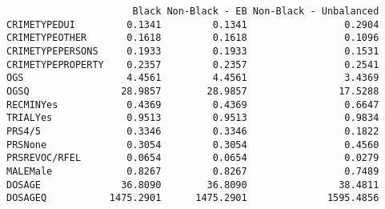 \documentclass[
  letterpaper,
  DIV=11,
  numbers=noendperiod]{scrartcl}
\newenvironment{Shaded}{\begin{snugshade}}{\end{snugshade}}
\newcommand{\AttributeTok}[1]{\textcolor[rgb]{0.40,0.45,0.13}{#1}}
\newcommand{\DecValTok}[1]{\textcolor[rgb]{0.68,0.00,0.00}{#1}}
\newcommand{\FunctionTok}[1]{\textcolor[rgb]{0.28,0.35,0.67}{#1}}
\newcommand{\NormalTok}[1]{\textcolor[rgb]{0.00,0.23,0.31}{#1}}
\newcommand{\OtherTok}[1]{\textcolor[rgb]{0.00,0.23,0.31}{#1}}
\newcommand{\SpecialCharTok}[1]{\textcolor[rgb]{0.37,0.37,0.37}{#1}}
\newcommand{\StringTok}[1]{\textcolor[rgb]{0.13,0.47,0.30}{#1}}
\begin{document}
\begin{Shaded}
\end{Shaded}

\begin{verbatim}
                      Black Non-Black - EB Non-Black - Unbalanced
CRIMETYPEDUI         0.1341         0.1341                 0.2904
CRIMETYPEOTHER       0.1618         0.1618                 0.1096
CRIMETYPEPERSONS     0.1933         0.1933                 0.1531
CRIMETYPEPROPERTY    0.2357         0.2357                 0.2541
OGS                  4.4561         4.4561                 3.4369
OGSQ                28.9857        28.9857                17.5288
RECMINYes            0.4369         0.4369                 0.6647
TRIALYes             0.9513         0.9513                 0.9834
PRS4/5               0.3346         0.3346                 0.1822
PRSNone              0.3054         0.3054                 0.4560
PRSREVOC/RFEL        0.0654         0.0654                 0.0279
MALEMale             0.8267         0.8267                 0.7489
DOSAGE              36.8090        36.8090                38.4811
DOSAGEQ           1475.2901      1475.2901              1595.4856
\end{verbatim}

\begin{Shaded}
\end{Shaded}
\end{document}
